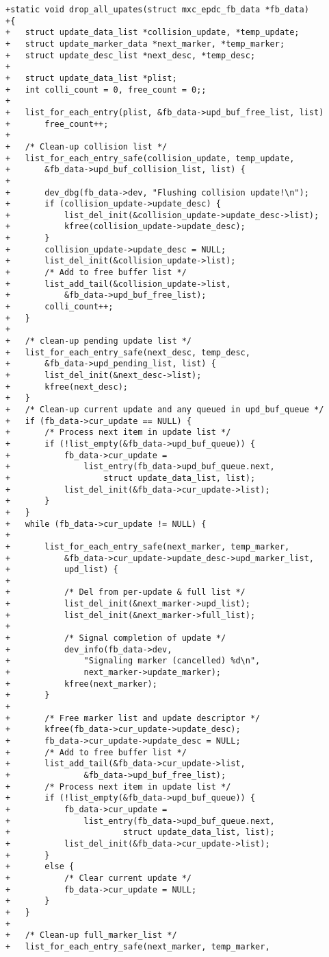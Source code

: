 \documentclass{memoir}
\begin{document}
\begin{verbatim}
+static void drop_all_upates(struct mxc_epdc_fb_data *fb_data)
+{
+	struct update_data_list *collision_update, *temp_update;
+	struct update_marker_data *next_marker, *temp_marker;
+	struct update_desc_list *next_desc, *temp_desc;
+
+	struct update_data_list *plist;
+	int colli_count = 0, free_count = 0;;
+
+	list_for_each_entry(plist, &fb_data->upd_buf_free_list, list)
+		free_count++;
+
+	/* Clean-up collision list */
+	list_for_each_entry_safe(collision_update, temp_update,
+		&fb_data->upd_buf_collision_list, list) {
+
+		dev_dbg(fb_data->dev, "Flushing collision update!\n");
+		if (collision_update->update_desc) {
+			list_del_init(&collision_update->update_desc->list);
+			kfree(collision_update->update_desc);
+		}
+		collision_update->update_desc = NULL;
+		list_del_init(&collision_update->list);
+		/* Add to free buffer list */
+		list_add_tail(&collision_update->list,
+			&fb_data->upd_buf_free_list);
+		colli_count++;
+	}
+
+	/* clean-up pending update list */
+	list_for_each_entry_safe(next_desc, temp_desc,
+		&fb_data->upd_pending_list, list) {
+		list_del_init(&next_desc->list);
+		kfree(next_desc);
+	}
+	/* Clean-up current update and any queued in upd_buf_queue */
+	if (fb_data->cur_update == NULL) {
+		/* Process next item in update list */
+		if (!list_empty(&fb_data->upd_buf_queue)) {
+			fb_data->cur_update =
+				list_entry(fb_data->upd_buf_queue.next,
+					struct update_data_list, list);
+			list_del_init(&fb_data->cur_update->list);
+		}
+	}
+	while (fb_data->cur_update != NULL) {
+
+		list_for_each_entry_safe(next_marker, temp_marker,
+			&fb_data->cur_update->update_desc->upd_marker_list,
+			upd_list) {
+
+			/* Del from per-update & full list */
+			list_del_init(&next_marker->upd_list);
+			list_del_init(&next_marker->full_list);
+
+			/* Signal completion of update */
+			dev_info(fb_data->dev,
+				"Signaling marker (cancelled) %d\n",
+				next_marker->update_marker);
+			kfree(next_marker);
+		}
+
+		/* Free marker list and update descriptor */
+		kfree(fb_data->cur_update->update_desc);
+		fb_data->cur_update->update_desc = NULL;
+		/* Add to free buffer list */
+		list_add_tail(&fb_data->cur_update->list,
+				&fb_data->upd_buf_free_list);
+		/* Process next item in update list */
+		if (!list_empty(&fb_data->upd_buf_queue)) {
+			fb_data->cur_update =
+				list_entry(fb_data->upd_buf_queue.next,
+						struct update_data_list, list);
+			list_del_init(&fb_data->cur_update->list);
+		}
+		else {
+			/* Clear current update */
+			fb_data->cur_update = NULL;
+		}
+	}
+
+	/* Clean-up full_marker_list */
+	list_for_each_entry_safe(next_marker, temp_marker,

\end{verbatim}
\end{document}
